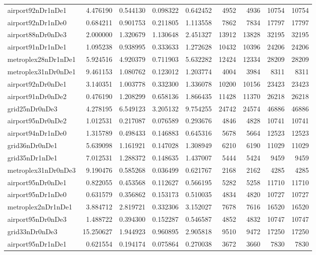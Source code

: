 \begin{longtable}{|l|r|r|r|r|r|r|r|r|}
airport92nDr1nDe1 & 4.476190 & 0.544130 & 0.098322 & 0.642452 & 4952 & 4936 & 10754 & 10754 \\
airport92nDr1nDe0 & 0.684211 & 0.901753 & 0.211805 & 1.113558 & 7862 & 7834 & 17797 & 17797 \\
airport88nDr0nDe3 & 2.000000 & 1.320679 & 1.130648 & 2.451327 & 13912 & 13828 & 32195 & 32195 \\
airport91nDr1nDe1 & 1.095238 & 0.938995 & 0.333633 & 1.272628 & 10432 & 10396 & 24206 & 24206 \\
metroplex28nDr1nDe1 & 5.924516 & 4.920379 & 0.711903 & 5.632282 & 12424 & 12334 & 28209 & 28209 \\
metroplex31nDr0nDe1 & 9.461153 & 1.080762 & 0.123012 & 1.203774 & 4004 & 3984 & 8311 & 8311 \\
airport92nDr0nDe1 & 3.140351 & 1.003778 & 0.332300 & 1.336078 & 10200 & 10156 & 23423 & 23423 \\
airport91nDr0nDe2 & 0.476190 & 1.208299 & 0.658136 & 1.866435 & 11428 & 11370 & 26218 & 26218 \\
grid25nDr0nDe3 & 4.278195 & 6.549123 & 3.205132 & 9.754255 & 24742 & 24574 & 46886 & 46886 \\
airport95nDr0nDe2 & 1.012531 & 0.217087 & 0.076589 & 0.293676 & 4846 & 4828 & 10741 & 10741 \\
airport94nDr1nDe0 & 1.315789 & 0.498433 & 0.146883 & 0.645316 & 5678 & 5664 & 12523 & 12523 \\
grid36nDr0nDe1 & 5.639098 & 1.161921 & 0.147028 & 1.308949 & 6210 & 6190 & 11029 & 11029 \\
grid35nDr1nDe1 & 7.012531 & 1.288372 & 0.148635 & 1.437007 & 5444 & 5424 & 9459 & 9459 \\
metroplex31nDr0nDe3 & 9.190476 & 0.585268 & 0.036499 & 0.621767 & 2168 & 2162 & 4285 & 4285 \\
airport95nDr0nDe1 & 0.822055 & 0.453568 & 0.112627 & 0.566195 & 5282 & 5258 & 11710 & 11710 \\
airport95nDr1nDe0 & 0.631579 & 0.356862 & 0.153173 & 0.510035 & 4834 & 4820 & 10727 & 10727 \\
metroplex2nDr1nDe1 & 3.884712 & 2.819721 & 0.332306 & 3.152027 & 7678 & 7616 & 16520 & 16520 \\
airport95nDr0nDe3 & 1.488722 & 0.394300 & 0.152287 & 0.546587 & 4852 & 4832 & 10747 & 10747 \\
grid33nDr0nDe3 & 15.250627 & 1.944923 & 0.960895 & 2.905818 & 9510 & 9472 & 17250 & 17250 \\
airport95nDr1nDe1 & 0.621554 & 0.194174 & 0.075864 & 0.270038 & 3672 & 3660 & 7830 & 7830 \\

\end{longtable}
